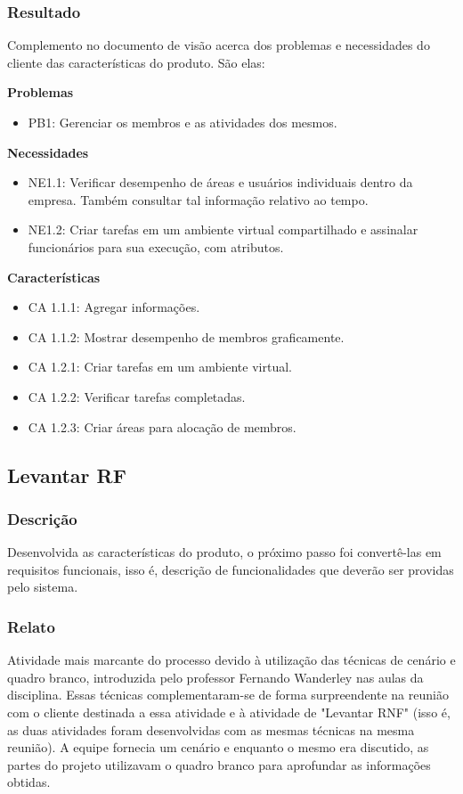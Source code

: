 \subsubsection{Resultado}
Complemento no documento de visão acerca dos problemas e necessidades do cliente das características do produto. São elas:

\textbf{Problemas}
\begin{itemize}
\item PB1: Gerenciar os membros e as atividades dos mesmos.
\end{itemize}

\textbf{Necessidades}
\begin{itemize}
\item NE1.1: Verificar desempenho de áreas e usuários individuais dentro da empresa. Também consultar tal informação relativo ao tempo.
\item NE1.2: Criar tarefas em um ambiente virtual compartilhado e assinalar funcionários para sua execução, com atributos.
\end{itemize}

\textbf{Características}
\begin{itemize}
\item CA 1.1.1: Agregar informações.
\item CA 1.1.2: Mostrar desempenho de membros graficamente.
\item CA 1.2.1: Criar tarefas em um ambiente virtual.
\item CA 1.2.2: Verificar tarefas completadas.
\item CA 1.2.3: Criar áreas para alocação de membros.
\end{itemize}

\subsection{Levantar RF}
\subsubsection{Descrição}
Desenvolvida as características do produto, o próximo passo foi convertê-las em requisitos funcionais, isso é, descrição de funcionalidades que deverão ser providas pelo sistema.

\subsubsection{Relato}
Atividade mais marcante do processo devido à utilização das técnicas de cenário e quadro branco, introduzida pelo professor Fernando Wanderley nas aulas da disciplina. Essas técnicas complementaram-se de forma surpreendente na reunião com o cliente destinada a essa atividade e à atividade de "Levantar RNF" (isso é, as duas atividades foram desenvolvidas com as mesmas técnicas na mesma reunião). A equipe fornecia um cenário e enquanto o mesmo era discutido, as partes do projeto utilizavam o quadro branco para aprofundar as informações obtidas.

